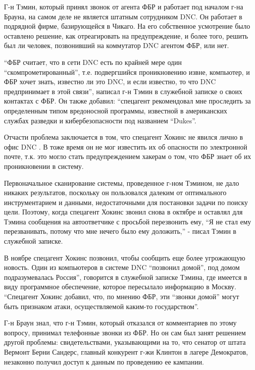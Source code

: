 Г-н Тэмин, который принял звонок от агента ФБР и работает под началом
г-на Брауна, на самом деле не является штатным сотрудником DNC. Он
работает в подрядной фирме, базирующейся в Чикаго. На его собственное
усмотрение было оставлено решение, как отреагировать на предупреждение,
и более того, решить был ли человек, позвонивший на коммутатор DNC
агентом ФБР, или нет.

``ФБР считает, что в сети DNC есть по крайней мере один
``скомпрометированный'', т.е. подвергшийся проникновению извне,
компьютер, и ФБР хочет знать, известно ли это DNC, и если известно, то
что DNC предпринимает в этой связи'', написал г-н Тэмин в служебной
записке о своих контактах с ФБР. Он также добавил: ``спецагент
рекомендовал мне проследить за определенным типом вредоносной программы,
известной в американских службах разведки и кибербезопасности под
названием ``Dukes''.

Отчасти проблема заключается в том, что спецагент Хокинс не явился лично
в офис DNC . В тоже время он не мог известить их об опасности по
электронной почте, т.к. это могло стать предупреждением хакерам о том,
что ФБР знает об их проникновении в систему.

Первоначальное сканирование системы, проведенное г-ном Тэмином, не дало
никаких результатов, поскольку он пользовался далеким от оптимального
инструментарием и данными, недостаточными для постановки задачи по
поиску цели. Поэтому, когда спецагент Хокинс звонил снова в октябре и
оставлял для Тэмина сообщения на автоответчике с просьбой перезвонить
ему, ``Я не стал ему перезванивать, потому что мне нечего было ему
доложить,'' - писал Тэмин в служебной записке.

В ноябре спецагент Хокинс позвонил, чтобы сообщить еще более угрожающую
новость. Один из компьютеров в системе DNC ``позвонил домой'', под домом
подразумевалась Россия'', говорится в служебной записке Тэмина, где
имеется в виду программное обеспечение, которое пересылало информацию в
Москву. ``Спецагент Хокинс добавил, что, по мнению ФБР, эти ``звонки
домой'' могут быть признаком атаки, осуществляемой каким-то
государством''.

Г-н Браун знал, что г-н Тэмин, который отказался от комментариев по
этому вопросу, принимал телефонные звонки из ФБР. Но он сам был занят
решением другой проблемы: свидетельствами, указывающими на то, что
сенатор от штата Вермонт Берни Сандерс, главный конкурент г-жи Клинтон в
лагере Демократов, незаконно получил доступ к данным по проведению ее
кампании.


